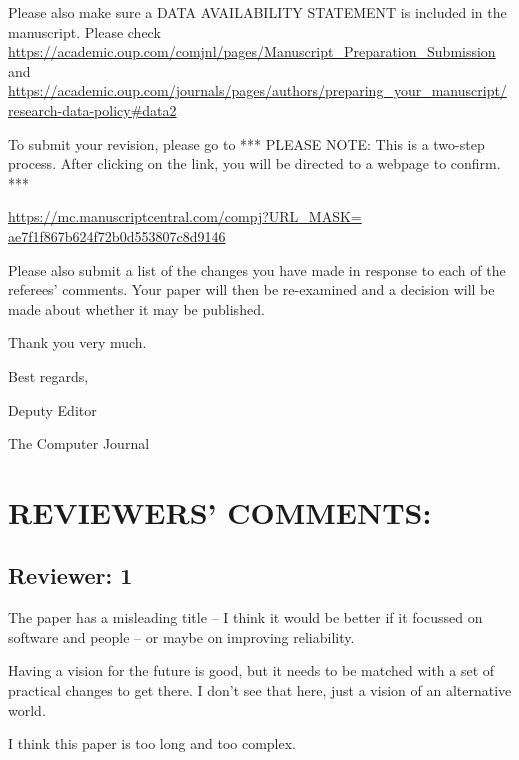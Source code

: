 \documentclass[11pt]{article}
\begin{document}
Please also make sure a DATA AVAILABILITY STATEMENT is included in the manuscript. Please check\\\url{https://academic.oup.com/comjnl/pages/Manuscript_Preparation_Submission} and \url{https://academic.oup.com/journals/pages/authors/preparing_your_manuscript/research-data-policy#data2}

To submit your revision, please go to *** PLEASE NOTE: This is a two-step process. After clicking on the link, you will be directed to a webpage to confirm. ***

\url{https://mc.manuscriptcentral.com/compj?URL_MASK=}\\\url{ae7f1f867b624f72b0d553807c8d9146}

Please also submit a list of the changes you have made in response to each of the referees' comments. Your paper will then be re-examined and a decision will be made about whether it may be published.

Thank you very much.

Best regards,

Deputy Editor

The Computer Journal

\newpage

\section{REVIEWERS' COMMENTS:}

\subsection{Reviewer: 1}

The paper has a misleading title -- I think it would be better if it focussed on software and people -- or maybe on improving reliability. 

Having a vision for the future is good, but it needs to be matched with a set of practical changes to get there. I don't see that here, just a vision of an alternative world.

I think this paper is too long and too complex.  
\end{document}
